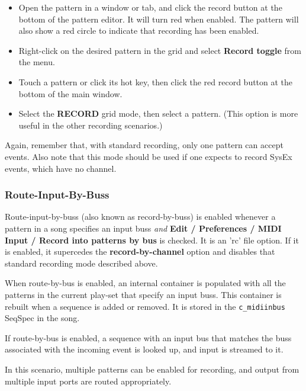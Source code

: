    \begin{itemize}
      \item Open the pattern in a window or tab, and click the record
         button at the bottom of the pattern editor.
         It will turn red when enabled. The pattern will also
         show a red circle to indicate that recording has been enabled.
      \item Right-click on the desired pattern in the grid and select
         \textbf{Record toggle} from the menu.
      \item Touch a pattern or click its hot key, then
         click the red record button at the bottom of the main window.
      \item Select the \textbf{RECORD} grid mode, then select a pattern.
         (This option is more useful in the other recording scenarios.)
   \end{itemize}

   Again, remember that, with standard recording, only one pattern can
   accept events.
   Also note that this mode should be used if one
   expects to record SysEx events, which have no channel.

\subsubsection{Route-Input-By-Buss}
\label{subsubsec:recording_route_by_buss}

   Route-input-by-buss (also known as record-by-buss)
   is enabled whenever a pattern in a song specifies an
   input buss \textsl{and}
   \textbf{Edit / Preferences / MIDI Input / Record into patterns by
   bus} is checked. It is an 'rc' file option.
   If it is enabled, it supercedes the
   \textbf{record-by-channel} option and
   disables that standard recording mode described above.

   When route-by-bus is enabled, an internal container is populated with
   all the patterns in the current play-set that specify an input buss.
   This container is rebuilt when a sequence is added or removed.
   It is stored in the \texttt{c\_midiinbus} SeqSpec in the song.

   If route-by-bus is enabled, a sequence with an input bus that matches the
   buss associated with the incoming event is looked up, and input is
   streamed to it.

   In this scenario, multiple patterns can be enabled for recording,
   and output from multiple input ports are routed appropriately.

